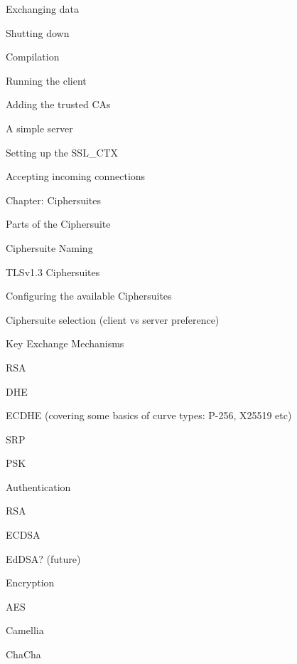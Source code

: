 \documentclass[oneside]{book}
\begin{document}
\begin{outline}
\begin{outline}
\begin{outline}
\begin{outline}
        \item{Exchanging data}
        \item{Shutting down}
      \end{outline}
      \item{Compilation}
      \item{Running the client}
      \item{Adding the trusted CAs}
      \item{A simple server}
      \begin{outline}
        \item{Setting up the SSL\_CTX}
        \item{Accepting incoming connections}
      \end{outline}
    \end{outline}
    \item{Chapter: Ciphersuites}
    \begin{outline}
      \item{Parts of the Ciphersuite}
      \item{Ciphersuite Naming}
      \item{TLSv1.3 Ciphersuites}
      \item{Configuring the available Ciphersuites}
      \item{Ciphersuite selection (client vs server preference)}
      \item{Key Exchange Mechanisms}
      \begin{outline}
        \item{RSA}
        \item{DHE}
        \item{ECDHE (covering some basics of curve types: P-256, X25519 etc)}
        \item{SRP}
        \item{PSK}
      \end{outline}
      \item{Authentication}
      \begin{outline}
        \item{RSA}
        \item{ECDSA}
        \item{EdDSA? (future)}
      \end{outline}
      \item{Encryption}
      \begin{outline}
        \item{AES}
        \item{Camellia}
        \item{ChaCha}

\end{outline}
\end{outline}
\end{outline}
\end{outline}
\end{document}
